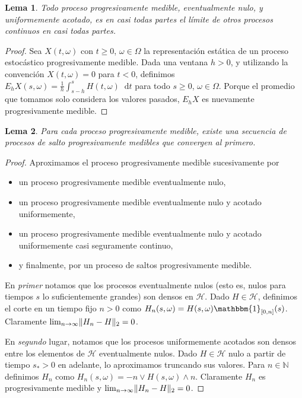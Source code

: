 \documentclass{report}
\newcommand{\characteristic}{\mathbbm{1}}
\newcommand{\dd}{\mathop{}\!\mathrm{d}}
\newcommand{\naturalNumbers}{\mathbb{N}}
\DeclarePairedDelimiter{\norm}{\|}{\|}
\theoremstyle{plain}
\newtheorem{lemma}{Lema}
\theoremstyle{remark}
\theoremstyle{definition}
\begin{document}
\begin{lemma}
  Todo proceso progresivamente medible, eventualmente nulo, y uniformemente acotado, es en casi todas partes el límite de otros procesos continuos en casi todas partes. 
\end{lemma}
\begin{proof}
  Sea \(X(t, \omega)\) con \(t \geq 0\), \(\omega \in \Omega\) la representación estática de un proceso estocástico progresivamente medible.
  Dada una ventana \(h > 0\), y utilizando la convención \(X(t, \omega) = 0\) para \(t < 0\), definimos \(E_h X (s, \omega) = \frac{1}{h} \int_{s - h}^{s} H(t, \omega) \dd t\) para todo \(s \geq 0\), \(\omega \in \Omega\).
  Porque el promedio que tomamos solo considera los valores pasados, \(E_h X\) es nuevamente progresivamente medible.
  
\end{proof}

\begin{lemma}
  Para cada proceso progresivamente medible, existe una secuencia de procesos de salto progresivamente medibles que convergen al primero.
\end{lemma}
\begin{proof}
  Aproximamos el proceso progresivamente medible sucesivamente por
  \begin{itemize}
    \item un proceso progresivamente medible eventualmente nulo,
    \item un proceso progresivamente medible eventualmente nulo y acotado uniformemente,
    \item  un proceso progresivamente medible eventualmente nulo y acotado uniformemente casi seguramente continuo,
    \item y finalmente, por un proceso de saltos progresivamente medible.
  \end{itemize}
  
  En \emph{primer} notamos que los procesos eventualmente nulos (esto es, nulos para tiempos \(s\) lo suficientemente grandes) son densos en \(\mathcal{H}\).
  Dado \(H \in \mathcal{H}\), definimos el corte en un tiempo fijo \(n > 0\) como \(H_n(s, \omega) = H(s, \omega) \characteristic_{[0, n]}(s)\).
  Claramente \(\lim_{n \rightarrow \infty} \norm{H_n - H}_2 = 0\).

  En \emph{segundo} lugar, notamos que los procesos uniformemente acotados son densos entre los elementos de \(\mathcal{H}\) eventualmente nulos.
  Dado \(H \in \mathcal{H}\) nulo a partir de tiempo \(s_* > 0\) en adelante, lo aproximamos truncando sus valores.
  Para \(n \in \naturalNumbers\) definimos \(H_n\) como \(H_n(s, \omega) = -n \vee H(s, \omega) \wedge n\).
  Claramente \(H_n\) es progresivamente medible y \(\lim_{n \rightarrow \infty} \norm{H_n - H}_2 = 0\).
\end{proof}
\end{document}
